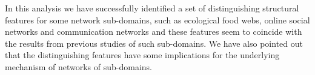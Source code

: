  In this analysis we have successfully identified a set of distinguishing structural features for some network sub-domains, such as ecological food webs, online social networks and communication networks and these features seem to coincide with the results from previous studies of such sub-domains. We have also pointed out that the distinguishing features have some implications for the underlying mechanism of networks of sub-domains.

\begin{figure}
\centering 

\qquad
{}

\medskip

\qquad
{}


\end{figure}
